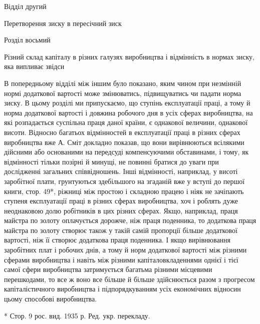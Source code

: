 \parcont{}  %
Відділ другий

Перетворення зиску в пересічний зиск

Розділ восьмий

Різний склад капіталу в різних галузях виробництва
і відмінність в нормах зиску, яка випливає звідси

В попередньому відділі між іншим було показано, яким чином
при незмінній нормі додаткової вартості може змінюватись, підвищуватись
чи падати норма зиску. В цьому розділі ми припускаємо,
що ступінь експлуатації праці, а тому й норма додаткової
вартості і довжина робочого дня в усіх сферах виробництва,
на які розпадається суспільна праця даної країни, є однакової величини,
однакової висоти. Відносно багатьох відмінностей в експлуатації
праці в різних сферах виробництва вже А. Сміт докладно показав,
що вони вирівнюються всілякими дійсними або основаними на передсуді
компенсуючими обставинами, і тому, як відмінності тільки
позірні й минущі, не повинні братися до уваги при дослідженні загальних
співвідношень. Інші відмінності, наприклад, у висоті заробітної
плати, грунтуються здебільшого на згаданій вже у вступі до
першої книги, стор. 49*, ріжниці між простою і складною працею
і ніяк не зачіпають ступеня експлуатації праці в різних сферах
виробництва, хоч і роблять дуже неоднаковою долю робітників
в цих різних сферах. Якщо, наприклад, праця майстра по золоту
оплачується дорожче, ніж праця поденника, то додаткова праця
майстра по золоту створює також у такій самій пропорції більше
додаткової вартості, ніж її створює додаткова праця поденника.
І якщо вирівнювання заробітних плат і робочих днів, а тому й
норм додаткової вартості між різними сферами виробництва
і навіть між різними капіталовкладеннями однієї і тієї самої
сфери виробництва затримується багатьма різними місцевими
перешкодами, то все ж воно все більше й більше здійснюється
разом з прогресом капіталістичного виробництва і підпорядкуванням
усіх економічних відносин цьому способові виробництва.

* Стор. 9 рос. вид. 1935 р. Ред. укр. перекладу.
\parbreak{}  %
